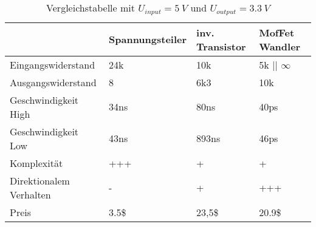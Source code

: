 \begin{frame}[c]{}


  \begin{table}
    \small
    \begin{tabular}{l|l|l|l}
      & Spannungsteiler & inv. Transistor & MofFet Wandler \\
      \hline 
      Eingangswiderstand        & 24k   & 10k    & 5k || $\infty$ \\
      Ausgangswiderstand        & 8     & 6k3    & 10k \\
      Geschwindigkeit High      & 34ns  & 80ns   & 40ps \\
      Geschwindigkeit Low       & 43ns  & 893ns  & 46ps \\
      Komplexität               & +++   & +      & +  \\
      Direktionalem Verhalten   & -     & +      & +++ \\
      Preis                     & 3.5\$ & 23,5\$ & 20.9\$ \\
    \end{tabular}
    \caption{Vergleichstabelle mit $U_{input} = \SI {5}{V} $ und $U_{output} = \SI {3.3}{V} $}
    \label{table:tabelle-vergleich1}
  
  \end{table}
    
\end{frame}
